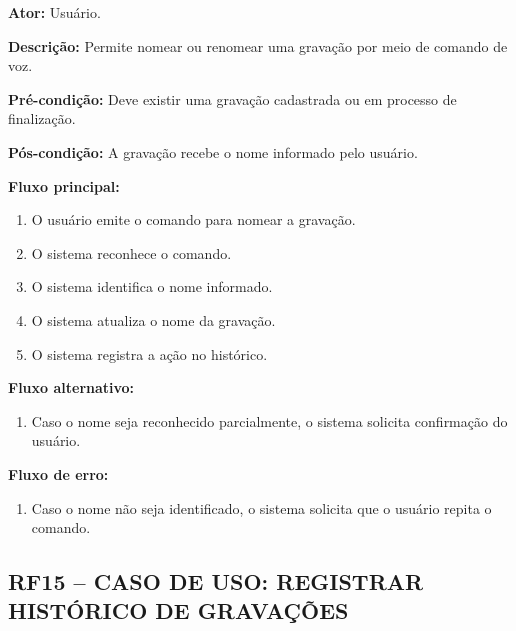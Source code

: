 \documentclass[12pt,oneside,a4paper,brazil,final]{abntex2}
\begin{document}
\textbf{Ator:} Usuário.



\textbf{Descrição:} Permite nomear ou renomear uma gravação por meio de comando de voz.



\textbf{Pré-condição:} Deve existir uma gravação cadastrada ou em processo de finalização.



\textbf{Pós-condição:} A gravação recebe o nome informado pelo usuário.



\textbf{Fluxo principal:}

\begin{enumerate}

    \item O usuário emite o comando para nomear a gravação.

    \item O sistema reconhece o comando.

    \item O sistema identifica o nome informado.

    \item O sistema atualiza o nome da gravação.

    \item O sistema registra a ação no histórico.

\end{enumerate}



\textbf{Fluxo alternativo:}

\begin{enumerate}

    \item Caso o nome seja reconhecido parcialmente, o sistema solicita confirmação do usuário.

\end{enumerate}



\textbf{Fluxo de erro:}

\begin{enumerate}

    \item Caso o nome não seja identificado, o sistema solicita que o usuário repita o comando.

\end{enumerate}



\clearpage
\subsection*{RF15 -- CASO DE USO: REGISTRAR HISTÓRICO DE GRAVAÇÕES}
\end{document}
